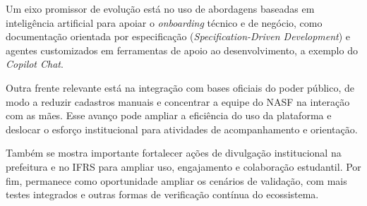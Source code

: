 Um eixo promissor de evolução está no uso de abordagens baseadas em
inteligência artificial para apoiar o \emph{onboarding} técnico e de
negócio, como documentação orientada por especificação
(\emph{Specification-Driven Development}) e agentes customizados em
ferramentas de apoio ao desenvolvimento, a exemplo do \emph{Copilot
Chat}.

Outra frente relevante está na integração com bases oficiais do poder
público, de modo a reduzir cadastros manuais e concentrar a equipe do
NASF na interação com as mães. Esse avanço pode ampliar a eficiência do
uso da plataforma e deslocar o esforço institucional para atividades de
acompanhamento e orientação.

Também se mostra importante fortalecer ações de divulgação institucional
na prefeitura e no IFRS para ampliar uso, engajamento e colaboração
estudantil. Por fim, permanece como oportunidade ampliar os cenários de
validação, com mais testes integrados e outras formas de verificação
contínua do ecossistema.
